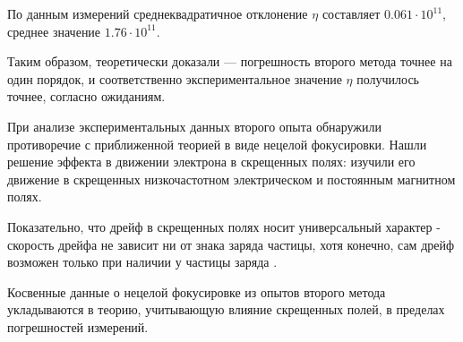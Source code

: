 По данным измерений среднеквадратичное отклонение $\eta$ составляет  $0.061\cdot10^{11}$, среднее значение $1.76\cdot10^{11}$.

Таким образом, теоретически доказали --- погрешность второго метода точнее на один порядок, и соответственно экспериментальное значение $\eta$ получилось точнее, согласно ожиданиям.

При анализе экспериментальных данных второго опыта обнаружили противоречие с приближенной теорией в виде нецелой фокусировки. Нашли решение эффекта в движении электрона в скрещенных полях: изучили его движение в скрещенных низкочастотном электрическом и постоянным магнитном полях. 

Показательно, что дрейф в скрещенных полях носит универсальный характер - скорость дрейфа не зависит ни от знака заряда частицы, хотя конечно, сам дрейф возможен только при наличии у частицы заряда \cite{radantscev}.

Косвенные данные о нецелой фокусировке из опытов второго метода укладываются в теорию, учитывающую влияние скрещенных полей, в пределах погрешностей измерений.

\newpage


